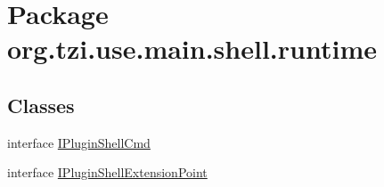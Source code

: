 \hypertarget{namespaceorg_1_1tzi_1_1use_1_1main_1_1shell_1_1runtime}{\section{Package org.\-tzi.\-use.\-main.\-shell.\-runtime}
\label{namespaceorg_1_1tzi_1_1use_1_1main_1_1shell_1_1runtime}
}
\subsection*{Classes}
\begin{DoxyCompactItemize}
\item 
interface \hyperlink{interfaceorg_1_1tzi_1_1use_1_1main_1_1shell_1_1runtime_1_1_i_plugin_shell_cmd}{I\-Plugin\-Shell\-Cmd}
\item 
interface \hyperlink{interfaceorg_1_1tzi_1_1use_1_1main_1_1shell_1_1runtime_1_1_i_plugin_shell_extension_point}{I\-Plugin\-Shell\-Extension\-Point}
\end{DoxyCompactItemize}
